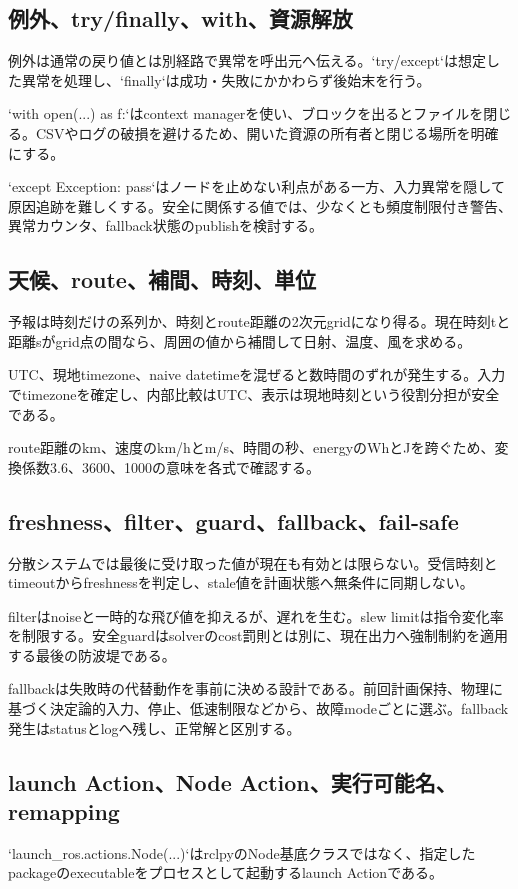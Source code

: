 \documentclass[a4paper,11pt]{article}
\begin{document}
\subsection{例外、try/finally、with、資源解放}
例外は通常の戻り値とは別経路で異常を呼出元へ伝える。`try/except`は想定した異常を処理し、`finally`は成功・失敗にかかわらず後始末を行う。


`with open(...) as f:`はcontext managerを使い、ブロックを出るとファイルを閉じる。CSVやログの破損を避けるため、開いた資源の所有者と閉じる場所を明確にする。


`except Exception: pass`はノードを止めない利点がある一方、入力異常を隠して原因追跡を難しくする。安全に関係する値では、少なくとも頻度制限付き警告、異常カウンタ、fallback状態のpublishを検討する。



\subsection{天候、route、補間、時刻、単位}
予報は時刻だけの系列か、時刻とroute距離の2次元gridになり得る。現在時刻tと距離sがgrid点の間なら、周囲の値から補間して日射、温度、風を求める。


UTC、現地timezone、naive datetimeを混ぜると数時間のずれが発生する。入力でtimezoneを確定し、内部比較はUTC、表示は現地時刻という役割分担が安全である。


route距離のkm、速度のkm/hとm/s、時間の秒、energyのWhとJを跨ぐため、変換係数3.6、3600、1000の意味を各式で確認する。



\subsection{freshness、filter、guard、fallback、fail-safe}
分散システムでは最後に受け取った値が現在も有効とは限らない。受信時刻とtimeoutからfreshnessを判定し、stale値を計画状態へ無条件に同期しない。


filterはnoiseと一時的な飛び値を抑えるが、遅れを生む。slew limitは指令変化率を制限する。安全guardはsolverのcost罰則とは別に、現在出力へ強制制約を適用する最後の防波堤である。


fallbackは失敗時の代替動作を事前に決める設計である。前回計画保持、物理に基づく決定論的入力、停止、低速制限などから、故障modeごとに選ぶ。fallback発生はstatusとlogへ残し、正常解と区別する。



\subsection{launch Action、Node Action、実行可能名、remapping}
`launch\_ros.actions.Node(...)`はrclpyのNode基底クラスではなく、指定したpackageのexecutableをプロセスとして起動するlaunch Actionである。
\end{document}
